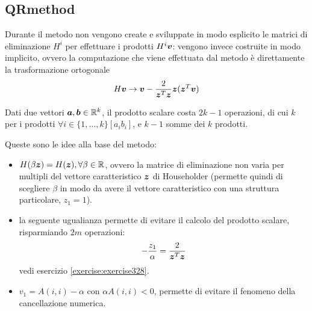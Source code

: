 \subsection{QRmethod}
\label{subsection:QRmethod}
\begin{oss}
Durante il metodo non vengono create e sviluppate in modo esplicito le matrici
di eliminazione $H^{i}$ per effettuare i prodotti $H^{i}\boldsymbol{v}$: vengono
invece costruite in modo implicito, ovvero la computazione che viene effettuata
dal metodo \`e direttamente la trasformazione ortogonale 
\begin{displaymath}
H\boldsymbol{v} \rightarrow \boldsymbol{v} -
\frac{2}{\boldsymbol{z}^{T}\boldsymbol{z}}\boldsymbol{z}(\boldsymbol{z}^{T}\boldsymbol{v})
\end{displaymath}
\end{oss}

\begin{oss}
Dati due vettori $\boldsymbol{a}, \boldsymbol{b} \in \mathbb{R}^{k}$, il prodotto scalare
costa $2k - 1$ operazioni, di cui $k$ per i prodotti $\forall i \in
\{1, \ldots , k \} [a_{i}b_{i}]$, e $k-1$ somme dei $k$ prodotti.
\end{oss}

\begin{oss}
Queste sono le idee alla base del metodo:
\begin{itemize}
  \item $H(\beta \boldsymbol{z}) = H(\boldsymbol{z}), \forall \beta \in \mathbb{R}$, ovvero
  la matrice di eliminazione non varia per multipli del vettore caratteristico
  $\boldsymbol{z}$ di Householder (permette quindi di scegliere $\beta$ in modo
  da avere il vettore caratteristico con una struttura particolare, $z_{1} =
  1$).
  
  \item la seguente ugualianza permette di evitare il calcolo del prodotto
  scalare, risparmiando $2m$ operazioni:
  	\begin{displaymath}
  		-\frac{z_{1}}{\alpha} =
  		\frac{2}{\boldsymbol{z}^{T}\boldsymbol{z}}
  	\end{displaymath}
  vedi esercizio \ref{exercise:exercise328}.
  
  \item $v_{1} = A(i, i) - \alpha$ con $\alpha A(i, i) < 0$, permette di
  evitare il fenomeno della cancellazione numerica.
\end{itemize}
\end{oss}

